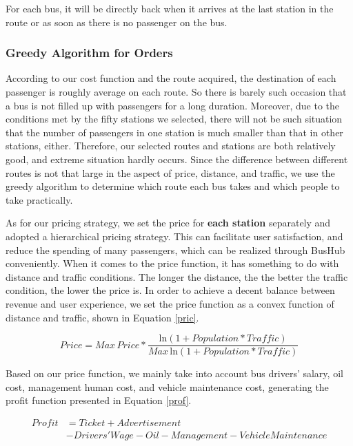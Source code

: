\documentclass{mcmthesis}
\begin{document}
For each bus, it will be directly back when it arrives at the last station in the route or as soon as there is no passenger on the bus.

\subsubsection{Greedy Algorithm for Orders}

According to our cost function and the route acquired, the destination of each passenger is roughly average on each route. So there is barely such occasion that a bus is not filled up with passengers for a long duration. Moreover, due to the conditions met by the fifty stations we selected, there will not be such situation that the number of passengers in one station is much smaller than that in other stations, either. Therefore, our selected routes and stations are both relatively good, and extreme situation hardly occurs. Since the difference between different routes is not that large in the aspect of price, distance, and traffic, we use the greedy algorithm to determine which route each bus takes and which people to take practically.

As for our pricing strategy, we set the price for \textbf{each station} separately and adopted a hierarchical pricing strategy. This can facilitate user satisfaction, and reduce the spending of many passengers, which can be realized through BusHub conveniently. When it comes to the price function, it has something to do with distance and traffic conditions. The longer the distance, the the better the traffic condition, the lower the price is. In order to achieve a decent balance between revenue and user experience, we set the price function as a convex function of distance and traffic, shown in Equation \ref{pric}.


\begin{equation}\label{pric}
    Price=Max\, Price * \frac{\mathrm{ln} (1+ Population * Traffic)}{Max\, \mathrm{ln} (1+ Population * Traffic)}  
\end{equation}

Based on our price function, we mainly take into account bus drivers' salary, oil cost, management human cost, and vehicle maintenance cost, generating the profit function presented in Equation \ref{prof}.

\begin{equation}
    \begin{split}
     Profit &= Ticket + Advertisement\\ 
           &- Drivers' Wage - Oil - Management - Vehicle Maintenance  
    \end{split}
    \label{prof}
\end{equation}
\end{document}
